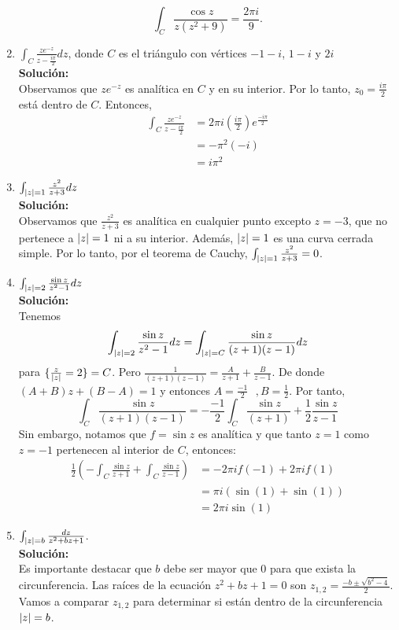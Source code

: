 \begin{enumerate}
		$$\int_{C}\frac{\cos{z}}{z(z^{2}+9)} = \frac{2\pi i}{9}. $$
		\item $\int_{C} \frac{ze^{-z}}{z-\frac{i\pi}{2}}dz$, donde $C$ es el triángulo con vértices $-1-i$, $1-i$ y $2i$
		\\ \textbf{Solución:} \\
		Observamos que $ze^{-z}$ es analítica en $C$ y en su interior. Por lo tanto, $z_0=\frac{i\pi}{2}$ está dentro de $C$. Entonces,
		\begin{align*}
			\int_{C}\frac{ze^{-z}}{z-\frac{i\pi}{2}} &= 2\pi i \left(\frac{i\pi}{2}\right)e^{\frac{-i\pi}{2}}\\
			&= -\pi^{2}(-i) \\
			&= i\pi^{2}
		\end{align*}
		\item $\int_{\lvert z\rvert=1} \frac{z^{2}}{z+3}dz$
		\\ \textbf{Solución:} \\
		Observamos que $\frac{z^{2}}{z+3}$ es analítica en cualquier punto excepto $z=-3$, que no pertenece a $\lvert z\rvert=1$ ni a su interior. Además, $\lvert z\rvert=1$ es una curva cerrada simple. Por lo tanto, por el teorema de Cauchy, $\int_{\lvert z\rvert=1}\frac{z^{2}}{z+3}=0$.
		\item $\int_{\lvert z\rvert=2} \frac{\sin{z}}{z^{2}-1}dz$
		\\ \textbf{Solución:} \\
		Tenemos 
		$$\int_{\lvert z\rvert=2} \frac{\sin{z}}{z^{2}-1}dz = \int_{\lvert z\rvert=C} \frac{\sin{z}}{(z+1)(z-1)}dz$$ 
		para $\{ \frac{z}{\lvert z\rvert}=2\}=C$. Pero $\frac{1}{(z+1)(z-1)}=\frac{A}{z+1}+\frac{B}{z-1}$.
		De donde $(A+B)z+(B-A)=1$ y entonces $A=\frac{-1}{2}\text{ }, B=\frac{1}{2}$. Por tanto, 
		$$\int_{C} \frac{\sin{z}}{(z+1)(z-1)}=-\frac{-1}{2}\int_{C}\frac{\sin{z}}{(z+1)}+\frac{1}{2}\frac{\sin{z}}{z-1}$$
		Sin embargo, notamos que $f=\sin{z}$ es analítica y que tanto $z=1$ como $z=-1$ pertenecen al interior de $C$, entonces:
		\begin{align*}
			\frac{1}{2}\left(-\int_{C} \frac{\sin{z}}{z+1}+\int_{C}\frac{\sin{z}}{z-1}\right)&=-2\pi i f(-1)+2\pi i f(1) \\
			&= \pi i \left(\sin(1)+\sin(1)\right) \\
			&= 2\pi i \sin(1)
		\end{align*}
		\item $\int_{\lvert z\rvert=b}\frac{dz}{z^{2}+bz+1}$.
		\\ \textbf{Solución:} \\
		Es importante destacar que $b$ debe ser mayor que 0 para que exista la circunferencia. Las raíces de la ecuación $z^{2}+bz+1=0$ son $z_{1,2} = \frac{-b \pm \sqrt{b^{2}-4}}{2}$. Vamos a comparar $z_{1,2}$ para determinar si están dentro de la circunferencia $\lvert z\rvert=b$.
		

\end{enumerate}
